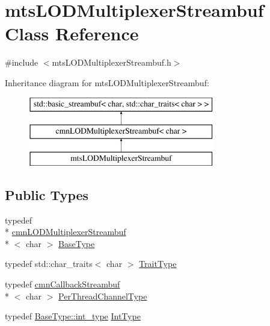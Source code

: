 \hypertarget{classmts_l_o_d_multiplexer_streambuf}{\section{mts\-L\-O\-D\-Multiplexer\-Streambuf Class Reference}
\label{classmts_l_o_d_multiplexer_streambuf}
}


{\ttfamily \#include $<$mts\-L\-O\-D\-Multiplexer\-Streambuf.\-h$>$}

Inheritance diagram for mts\-L\-O\-D\-Multiplexer\-Streambuf\-:\begin{figure}[H]
\begin{center}
\leavevmode
\includegraphics[height=3.000000cm]{d3/dd6/classmts_l_o_d_multiplexer_streambuf}
\end{center}
\end{figure}
\subsection*{Public Types}
\begin{DoxyCompactItemize}
\item 
typedef \\*
\hyperlink{classcmn_l_o_d_multiplexer_streambuf}{cmn\-L\-O\-D\-Multiplexer\-Streambuf}\\*
$<$ char $>$ \hyperlink{classmts_l_o_d_multiplexer_streambuf_a61c8f5498c012321fdc38e97a43393a2}{Base\-Type}
\item 
typedef std\-::char\-\_\-traits$<$ char $>$ \hyperlink{classmts_l_o_d_multiplexer_streambuf_aad2a9ad3c0067d2f8cde938845daa252}{Trait\-Type}
\item 
typedef \hyperlink{classcmn_callback_streambuf}{cmn\-Callback\-Streambuf}\\*
$<$ char $>$ \hyperlink{classmts_l_o_d_multiplexer_streambuf_a945f4bdc4f4a79290018377ae3de68e9}{Per\-Thread\-Channel\-Type}
\item 
typedef \hyperlink{classcmn_l_o_d_multiplexer_streambuf_a8d1eadc5cf72b594aa2c2fef6401fe47}{Base\-Type\-::int\-\_\-type} \hyperlink{classmts_l_o_d_multiplexer_streambuf_a21823525be07ef7a8c1c3b053f3fedf2}{Int\-Type}
\end{DoxyCompactItemize}
